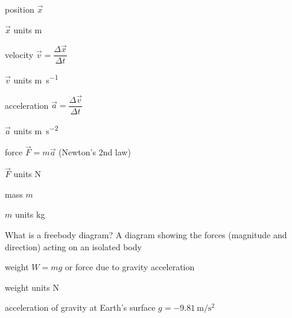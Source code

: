 \documentclass[avery5371,grid]{flashcards}
\begin{document}

\begin{flashcard}{position}
$\vec{x}$
\end{flashcard}
\begin{flashcard}{$\vec{x}$ units}
\si{\meter}
\end{flashcard}

\begin{flashcard}{velocity}
$\vec{v} = \dfrac{\Delta \vec{x}}{\Delta t}$
\end{flashcard}
\begin{flashcard}{$\vec{v}$ units}
\si{\meter\per\second}
\end{flashcard}

\begin{flashcard}{acceleration}
$\vec{a} = \dfrac{\Delta \vec{v}}{\Delta t}$
\end{flashcard}
\begin{flashcard}{$\vec{a}$ units}
\si{\meter\per\second\squared}
\end{flashcard}

\begin{flashcard}{force}
$\vec{F}=m\vec{a}$ (Newton's 2nd law)
\end{flashcard}
\begin{flashcard}{$\vec{F}$ units}
\si{\newton}
\end{flashcard}
\begin{flashcard}{mass}
$m$
\end{flashcard}
\begin{flashcard}{$m$ units}
\si{\kilo\gram}
\end{flashcard}
\begin{flashcard}{What is a freebody diagram?}
A diagram showing the forces (magnitude and direction) acting on an isolated body
\end{flashcard}
\begin{flashcard}{weight}
$W=mg$ or force due to gravity acceleration
\end{flashcard}
\begin{flashcard}{weight units}
\si{\newton}
\end{flashcard}
\begin{flashcard}{acceleration of gravity at Earth's surface}
$g = \SI{-9.81}{\meter\per\second\squared}$
\end{flashcard}
\end{document}
